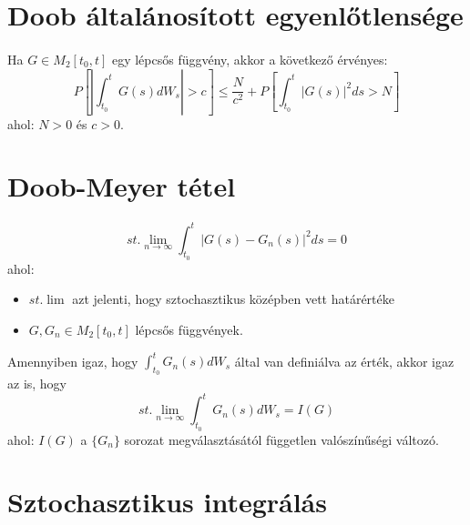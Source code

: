 \documentclass[11pt,a4paper]{article}
\begin{document}
			\section{Doob általánosított egyenlőtlensége}
				\paragraph{}
					Ha $G \in M_2[t_0,t]$ egy lépcsős függvény, akkor a következő érvényes:
					$$
					P \left[ \left| \int_{t_0}^tG(s)dW_s \right| > c \right] \le \dfrac{N}{c^2} + P \left[ \int_{t_0}^t |G(s)|^2 ds > N \right]
					$$
					ahol: $N>0$ és $c > 0$.
			\section{Doob-Meyer tétel}
				\paragraph{}
					$${st.\lim_{n \to \infty}} \int_{t_0}^t | G(s) - G_n(s)|^2ds = 0$$
					ahol:
					\begin{itemize}
					\item ${st. \lim}$ azt jelenti, hogy sztochasztikus középben vett határértéke
					\item $G, G_n \in M_2[t_0,t]$ lépcsős függvények.
					\end{itemize}
					Amennyiben igaz, hogy $\int_{t_0}^t G_n(s) dW_s$ által van definiálva az érték, akkor igaz az is, hogy
					$${st. \lim_{n \to \infty}} \int_{t_0}^t G_n(s) dW_s = I(G)$$
					ahol: $I(G)$ a $\{G_n\}$ sorozat megválasztásától független valószínűségi változó.
			\section{Sztochasztikus integrálás}
\end{document}
